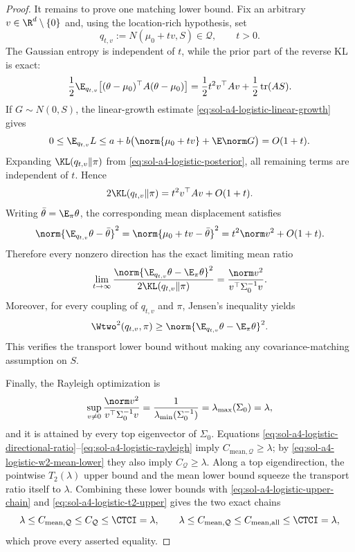 \documentclass[../main.tex]{subfiles}
\begin{document}
\begin{proof}
It remains to prove one matching lower bound.  Fix an arbitrary $v\in\R^d\setminus\{0\}$ and,
using the location-rich hypothesis, set
\[
 q_{t,v}:=N(\mu_0+tv,S)\in\mathcal Q,
 \qquad t>0.
\]
The Gaussian entropy is independent of $t$, while the prior part of the reverse KL is exact:
\[
 \frac12\E_{q_{t,v}}
 \big[(\theta-\mu_0)^\top A(\theta-\mu_0)\big]
 =\frac12t^2v^\top Av+\frac12\operatorname{tr}(AS).
\]
If $G\sim N(0,S)$, the linear-growth estimate \eqref{eq:sol-a4-logistic-linear-growth} gives
\[
 0\le\E_{q_{t,v}}L
 \le a+b\big(\norm{\mu_0+tv}+\E\norm G\big)=O(1+t).
\]
Expanding $\KL(q_{t,v}\|\pi)$ from \eqref{eq:sol-a4-logistic-posterior}, all remaining terms
are independent of $t$.  Hence
\begin{equation}\label{eq:sol-a4-logistic-kl-asymptotic}
 2\KL(q_{t,v}\|\pi)=t^2v^\top Av+O(1+t).
\end{equation}
Writing $\bar\theta=\E_\pi\theta$, the corresponding mean displacement satisfies
\begin{equation}\label{eq:sol-a4-logistic-mean-asymptotic}
 \norm{\E_{q_{t,v}}\theta-\bar\theta}^2
 =\norm{\mu_0+tv-\bar\theta}^2
 =t^2\norm v^2+O(1+t).
\end{equation}
Therefore every nonzero direction has the exact limiting mean ratio
\begin{equation}\label{eq:sol-a4-logistic-directional-ratio}
 \lim_{t\to\infty}
 \frac{\norm{\E_{q_{t,v}}\theta-\E_\pi\theta}^2}
      {2\KL(q_{t,v}\|\pi)}
 =\frac{\norm v^2}{v^\top\Sigma_0^{-1}v}.
\end{equation}
Moreover, for every coupling of $q_{t,v}$ and $\pi$, Jensen's inequality yields
\begin{equation}\label{eq:sol-a4-logistic-w2-mean-lower}
 \Wtwo^2(q_{t,v},\pi)
 \ge\norm{\E_{q_{t,v}}\theta-\E_\pi\theta}^2.
\end{equation}
This verifies the transport lower bound without making any covariance-matching assumption on
$S$.

Finally, the Rayleigh optimization is
\begin{equation}\label{eq:sol-a4-logistic-rayleigh}
 \sup_{v\ne0}\frac{\norm v^2}{v^\top\Sigma_0^{-1}v}
 =\frac1{\lambda_{\min}(\Sigma_0^{-1})}
 =\lambda_{\max}(\Sigma_0)=\lambda,
\end{equation}
and it is attained by every top eigenvector of $\Sigma_0$.  Equations
\eqref{eq:sol-a4-logistic-directional-ratio}--\eqref{eq:sol-a4-logistic-rayleigh} imply
$C_{\mathrm{mean},\mathcal Q}\ge\lambda$; by
\eqref{eq:sol-a4-logistic-w2-mean-lower} they also imply $C_{\mathcal Q}\ge\lambda$.  Along a
top eigendirection, the pointwise $T_2(\lambda)$ upper bound and the mean lower bound squeeze the
transport ratio itself to $\lambda$.  Combining these lower bounds with
\eqref{eq:sol-a4-logistic-upper-chain} and \eqref{eq:sol-a4-logistic-t2-upper} gives the two exact
chains
\[
 \lambda\le C_{\mathrm{mean},\mathcal Q}\le C_{\mathcal Q}
 \le\CTCI=\lambda,
 \qquad
 \lambda\le C_{\mathrm{mean},\mathcal Q}\le C_{\mathrm{mean},\mathrm{all}}
 \le\CTCI=\lambda,
\]
which prove every asserted equality.
\end{proof}
\end{document}
